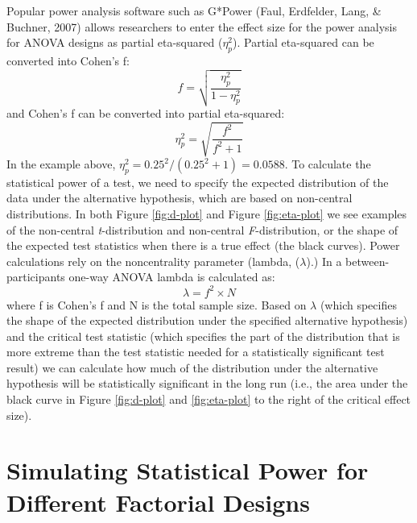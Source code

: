 \documentclass[,jou, draftfirst, a4paper,floatsintext]{apa6}
\begin{document}
Popular power analysis software such as G*Power (Faul, Erdfelder, Lang, \& Buchner, 2007) allows researchers to enter the effect size for the power analysis for ANOVA designs as partial eta-squared (\(\eta_p^2\)).
Partial eta-squared can be converted into Cohen's f:
\begin{equation}
f = \sqrt{\frac{\eta_p^2}{1-\eta_p^2}} \label{eq:eta-to-f}
\end{equation}
and Cohen's f can be converted into partial eta-squared:
\begin{equation}
\eta_p^2 = \sqrt{\frac{f^2}{f^2+1}} \label{eq:f-to-eta}
\end{equation}
In the example above, \(\eta_p^2 = 0.25^2/(0.25^2+1) = 0.0588\).
To calculate the statistical power of a test, we need to specify the expected distribution of the data under the alternative hypothesis, which are based on non-central distributions.
In both Figure \ref{fig:d-plot} and Figure \ref{fig:eta-plot} we see examples of the non-central \emph{t}-distribution and non-central \emph{F}-distribution, or the shape of the expected test statistics when there is a true effect (the black curves).
Power calculations rely on the noncentrality parameter (lambda, (\(\lambda\)).)
In a between-participants one-way ANOVA lambda is calculated as:
\begin{equation}
\lambda = f^2 \times N \label{eq:lambda}
\end{equation}
where f is Cohen's f and N is the total sample size.
Based on \(\lambda\) (which specifies the shape of the expected distribution under the specified alternative hypothesis) and the critical test statistic (which specifies the part of the distribution that is more extreme than the test statistic needed for a statistically significant test result) we can calculate how much of the distribution under the alternative hypothesis will be statistically significant in the long run (i.e., the area under the black curve in Figure \ref{fig:d-plot} and \ref{fig:eta-plot} to the right of the critical effect size).

\hypertarget{simulating-statistical-power-for-different-factorial-designs}{%
\section{Simulating Statistical Power for Different Factorial Designs}\label{simulating-statistical-power-for-different-factorial-designs}}
\end{document}
